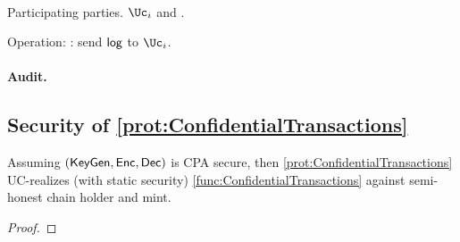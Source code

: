 \begin{protocol}~\label{prot:ConfidentialTransactions:History}
	\item[Participating parties.] $\Uc_i$ and \Cc.
		
	\item Operation: \Cc: send  $\mathsf{log}$ to $\Uc_i$.
	
\end{protocol}


\paragraph{Audit.} 


\subsection{Security of \cref{prot:ConfidentialTransactions}}
\begin{theorem}\label{thm:ConfidentialTransactions}
Assuming  $(\mathsf{KeyGen},\mathsf{Enc},\mathsf{Dec})$ is CPA secure, then \cref{prot:ConfidentialTransactions} UC-realizes (with static security) \cref{func:ConfidentialTransactions} against semi-honest chain holder and mint.
\end{theorem}

\begin{proof}
\end{proof}

